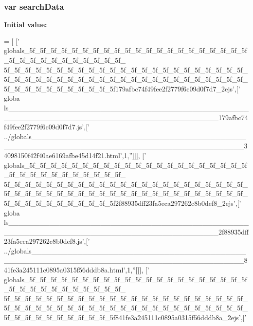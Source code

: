 \subsubsection[{search\+Data}]{\setlength{\rightskip}{0pt plus 5cm}var search\+Data}\label{files__5_8js_ad01a7523f103d6242ef9b0451861231e}
{\bfseries Initial value\+:}
\begin{DoxyCode}
=
[
  [\textcolor{stringliteral}{'
      globals\_5f\_5f\_5f\_5f\_5f\_5f\_5f\_5f\_5f\_5f\_5f\_5f\_5f\_5f\_5f\_5f\_5f\_5f\_5f\_5f\_5f\_5f\_5f\_5f\_5f\_5f\_5f\_5f\_5f\_5f\_5f\_5f\_
      5f\_5f\_5f\_5f\_5f\_5f\_5f\_5f\_5f\_5f\_5f\_5f\_5f\_5f\_5f\_5f\_5f\_5f\_5f\_5f\_5f\_5f\_5f\_5f\_5f\_5f\_5f\_5f\_5f\_5f\_5f\_5f\_5f\_5f\_5f\_5f\_5f\_5f\_5f\_5f\_5f\_5f\_5f\_5f\_5f\_5f\_5f\_5f\_5f\_5f\_5f\_5f\_5f\_5f\_5f\_5f\_5f179afbc74f49fee2f2779f6c09d0f7d7\_2ejs'},[\textcolor{stringliteral}{'
      globa
      ls\_\_\_\_\_\_\_\_\_\_\_\_\_\_\_\_\_\_\_\_\_\_\_\_\_\_\_\_\_\_\_\_\_\_\_\_\_\_\_\_\_\_\_\_\_\_\_\_\_\_\_\_\_\_\_\_\_\_\_\_\_\_\_\_\_\_\_\_\_\_\_\_\_\_\_\_\_\_\_\_\_\_\_\_\_\_\_\_\_179afbc74f49fee2f2779f6c09d0f7d7.js'},[\textcolor{stringliteral}{'
      ../globals\_\_\_\_\_\_\_\_\_\_\_\_\_\_\_\_\_\_\_\_\_\_\_\_\_\_\_\_\_\_\_\_\_\_\_\_\_\_\_\_\_\_\_\_\_\_\_\_\_\_\_\_\_\_\_\_\_\_\_\_\_\_\_\_\_\_\_\_\_\_\_\_\_\_\_\_\_\_\_\_\_\_\_\_\_\_\_\_\_34098150f42f40ae6169afbe45d14f21.html'},1,\textcolor{stringliteral}{''}]]],
  [\textcolor{stringliteral}{'
      globals\_5f\_5f\_5f\_5f\_5f\_5f\_5f\_5f\_5f\_5f\_5f\_5f\_5f\_5f\_5f\_5f\_5f\_5f\_5f\_5f\_5f\_5f\_5f\_5f\_5f\_5f\_5f\_5f\_5f\_5f\_5f\_5f\_
      5f\_5f\_5f\_5f\_5f\_5f\_5f\_5f\_5f\_5f\_5f\_5f\_5f\_5f\_5f\_5f\_5f\_5f\_5f\_5f\_5f\_5f\_5f\_5f\_5f\_5f\_5f\_5f\_5f\_5f\_5f\_5f\_5f\_5f\_5f\_5f\_5f\_5f\_5f\_5f\_5f\_5f\_5f\_5f\_5f\_5f\_5f\_5f\_5f\_5f\_5f\_5f\_5f\_5f\_5f\_5f\_5f2f88935dff23fa5eca297262c8b0def8\_2ejs'},[\textcolor{stringliteral}{'
      globa
      ls\_\_\_\_\_\_\_\_\_\_\_\_\_\_\_\_\_\_\_\_\_\_\_\_\_\_\_\_\_\_\_\_\_\_\_\_\_\_\_\_\_\_\_\_\_\_\_\_\_\_\_\_\_\_\_\_\_\_\_\_\_\_\_\_\_\_\_\_\_\_\_\_\_\_\_\_\_\_\_\_\_\_\_\_\_\_\_\_\_2f88935dff23fa5eca297262c8b0def8.js'},[\textcolor{stringliteral}{'
      ../globals\_\_\_\_\_\_\_\_\_\_\_\_\_\_\_\_\_\_\_\_\_\_\_\_\_\_\_\_\_\_\_\_\_\_\_\_\_\_\_\_\_\_\_\_\_\_\_\_\_\_\_\_\_\_\_\_\_\_\_\_\_\_\_\_\_\_\_\_\_\_\_\_\_\_\_\_\_\_\_\_\_\_\_\_\_\_\_\_\_841fe3a245111c0895a0315f56dddb8a.html'},1,\textcolor{stringliteral}{''}]]],
  [\textcolor{stringliteral}{'
      globals\_5f\_5f\_5f\_5f\_5f\_5f\_5f\_5f\_5f\_5f\_5f\_5f\_5f\_5f\_5f\_5f\_5f\_5f\_5f\_5f\_5f\_5f\_5f\_5f\_5f\_5f\_5f\_5f\_5f\_5f\_5f\_5f\_
      5f\_5f\_5f\_5f\_5f\_5f\_5f\_5f\_5f\_5f\_5f\_5f\_5f\_5f\_5f\_5f\_5f\_5f\_5f\_5f\_5f\_5f\_5f\_5f\_5f\_5f\_5f\_5f\_5f\_5f\_5f\_5f\_5f\_5f\_5f\_5f\_5f\_5f\_5f\_5f\_5f\_5f\_5f\_5f\_5f\_5f\_5f\_5f\_5f\_5f\_5f\_5f\_5f\_5f\_5f\_5f\_5f841fe3a245111c0895a0315f56dddb8a\_2ejs'},[\textcolor{stringliteral}{'
}
\end{DoxyCode}

